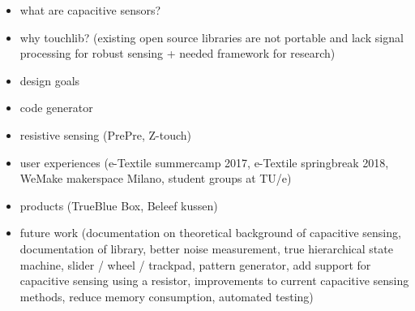 \documentclass[format=sigchi, screen=true, review=true]{acmart}
\begin{document}
\begin{itemize}
\item what are capacitive sensors?
\item why touchlib? (existing open source libraries are not portable and lack signal processing for robust sensing + needed framework for research)
\item design goals
\item code generator
\item resistive sensing (PrePre, Z-touch)
\item user experiences (e-Textile summercamp 2017, e-Textile springbreak 2018, WeMake makerspace Milano, student groups at TU/e)
\item products (TrueBlue Box, Beleef kussen)
\item future work (documentation on theoretical background of capacitive sensing, documentation of library, better noise measurement, true hierarchical state machine, slider / wheel / trackpad, pattern generator, add support for capacitive sensing using a resistor, improvements to current capacitive sensing methods, reduce memory consumption, automated testing)
\end{itemize}
\end{document}
